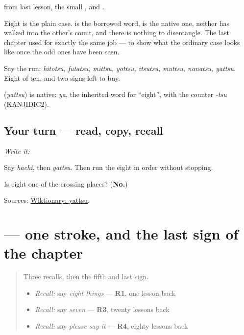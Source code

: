 \textbf{} from last lesson, the small \textbf{}, and \textbf{}.

Eight is the plain case. \textbf{} is the borrowed word, \textbf{} is the native one, neither has walked into the other's count, and there is nothing to disentangle. The last chapter used \textbf{} for exactly the same job — to show what the ordinary case looks like once the odd ones have been seen.

Say the run: \emph{hitotsu, futatsu, mittsu, yottsu, itsutsu, muttsu, nanatsu, yattsu.} Eight of ten, and two signs left to buy.

\begin{cousinweb}
\textbf{} (\emph{yattsu}) is native: \emph{ya}, the inherited word for \textquotedblleft{}eight\textquotedblright{}, with the counter \emph{-tsu} (KANJIDIC2).
\end{cousinweb}

\subsection*{Your turn — read, copy, recall}
\emph{Write it:} \textbf{}

Say \emph{hachi}, then \emph{yattsu}. Then run the eight in order without stopping.

\begin{tcolorbox}[breakable,colback=teal!4,colframe=teal!35!black,title={Before you move on}]
Is eight one of the crossing places? (\textbf{No.})

Sources: \href{https://en.wiktionary.org/wiki/\%E5\%85\%AB\%E3\%81\%A4}{Wiktionary: yattsu}.
\end{tcolorbox}
\section[\texorpdfstring{\ja{の} (no)}{の (no)}]{ — one stroke, and the last sign of the chapter}

\label{lesson:JA-W17-no}



\begin{quote}
Three recalls, then the fifth and last sign.

\begin{itemize}
\raggedright
  \item \emph{Recall:} say \emph{eight things} — \textbf{R1}, one lesson back
  \item \emph{Recall:} say \emph{seven} — \textbf{R3}, twenty lessons back
  \item \emph{Recall:} say \emph{please say it} — \textbf{R4}, eighty lessons back
\end{itemize}
\end{quote}

